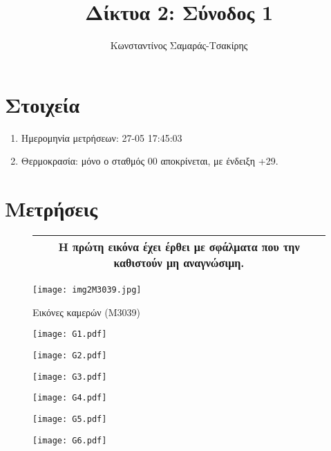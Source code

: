 \documentclass[a4paper,10pt]{article}
\title{Δίκτυα 2: Σύνοδος 1}
\author{Κωνσταντίνος Σαμαράς-Τσακίρης}
\begin{document}
\maketitle

\section{Στοιχεία}
\begin{enumerate}
	\item Ημερομηνία μετρήσεων: 27-05 17:45:03
	\item Θερμοκρασία: μόνο ο σταθμός 00 αποκρίνεται, με ένδειξη +29.
\end{enumerate}

\section{Μετρήσεις}
\begin{figure}
	\centering
	\begin{tabular}{c|c|c}
		\hline
	  &Η πρώτη εικόνα έχει έρθει με σφάλματα που την καθιστούν μη αναγνώσιμη.&\\
		\hline
	\end{tabular}

	\texttt{[image: img2M3039.jpg]}
	\caption{Εικόνες καμερών (M3039)}
\end{figure}
% 
\begin{figure}
	\centering
	\texttt{[image: G1.pdf]}
\end{figure}

\begin{figure}
	\centering
	\texttt{[image: G2.pdf]}
\end{figure}

\begin{figure}
	\centering
	\texttt{[image: G3.pdf]}
\end{figure}

\begin{figure}
	\centering
	\texttt{[image: G4.pdf]}
\end{figure}

\begin{figure}
	\centering
	\texttt{[image: G5.pdf]}
\end{figure}

\begin{figure}
	\centering
	\texttt{[image: G6.pdf]}
\end{figure}
\end{document}
